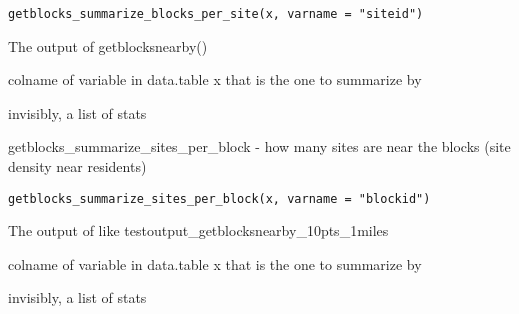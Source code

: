 \documentclass[a4paper]{book}
\begin{document}
%
\begin{Usage}
\begin{verbatim}
getblocks_summarize_blocks_per_site(x, varname = "siteid")
\end{verbatim}
\end{Usage}
%
\begin{Arguments}
\begin{ldescription}
\item[\code{x}] The output of getblocksnearby()

\item[\code{varname}] colname of variable in data.table x that is the one to summarize by
\end{ldescription}
\end{Arguments}
%
\begin{Value}
invisibly, a list of stats
\end{Value}
%
\begin{SeeAlso}\relax
{}
\end{SeeAlso}
%
\begin{Description}\relax
getblocks\_summarize\_sites\_per\_block - how many sites are near the blocks (site density near residents)
\end{Description}
%
\begin{Usage}
\begin{verbatim}
getblocks_summarize_sites_per_block(x, varname = "blockid")
\end{verbatim}
\end{Usage}
%
\begin{Arguments}
\begin{ldescription}
\item[\code{x}] The output of  like testoutput\_getblocksnearby\_10pts\_1miles

\item[\code{varname}] colname of variable in data.table x that is the one to summarize by
\end{ldescription}
\end{Arguments}
%
\begin{Value}
invisibly, a list of stats
\end{Value}
%
\begin{SeeAlso}\relax
{}
\end{SeeAlso}
\end{document}
